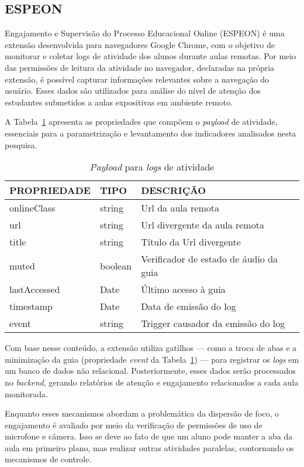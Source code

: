\subsection{ESPEON}
Engajamento e Supervisão do Processo Educacional Online (ESPEON) é uma extensão desenvolvida para navegadores Google Chrome, com o objetivo de monitorar e coletar logs de atividade dos alunos durante aulas remotas. Por meio das permissões de leitura da atividade no navegador, declaradas na própria extensão, é possível capturar informações relevantes sobre a navegação do usuário. Esses dados são utilizados para análise do nível de atenção dos estudantes submetidos a aulas expositivas em ambiente remoto.

A Tabela~\ref{tab:table2} apresenta as propriedades que compõem o \textit{payload} de atividade, essenciais para a parametrização e levantamento dos indicadores analisados nesta pesquisa.

\begin{table}[ht]
\centering
\caption{\textit{Payload} para \textit{logs} de atividade}
\label{tab:table2}
\begin{tabular}{|l|l|p{8cm}|}
\hline
\textbf{PROPRIEDADE} & \textbf{TIPO} & \textbf{DESCRIÇÃO} \\
\hline
onlineClass  & string  & Url da aula remota \\
\hline
url          & string  & Url divergente da aula remota \\
\hline
title        & string  & Título da Url divergente \\
\hline
muted        & boolean & Verificador de estado de áudio da 
guia \\
\hline
lastAccessed & Date    & Último acesso à guia \\
\hline
timestamp    & Date    & Data de emissão do log \\
\hline
event        & string  & Trigger causador da emissão do log \\
\hline
\end{tabular}
\end{table}


Com base nesse conteúdo, a extensão utiliza gatilhos — como a troca de abas e a minimização da guia (propriedade \textit{event} da Tabela~\ref{tab:table2}) — para registrar os \textit{logs} em um banco de dados não relacional. Posteriormente, esses dados serão processados no \textit{backend}, gerando relatórios de atenção e engajamento relacionados a cada aula monitorada.

Enquanto esses mecanismos abordam a problemática da dispersão de foco, o engajamento é avaliado por meio da verificação de permissões de uso de microfone e câmera. Isso se deve ao fato de que um aluno pode manter a aba da aula em primeiro plano, mas realizar outras atividades paralelas, contornando os mecanismos de controle.

